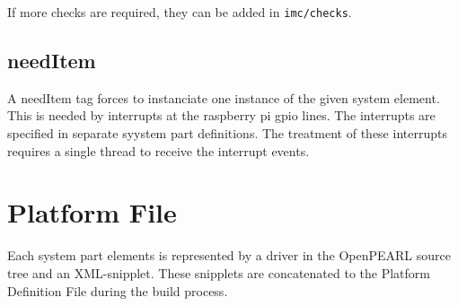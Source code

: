 If more checks are required, they can be added in \texttt{imc/checks}. 

\subsection{needItem}

A needItem tag forces to instanciate one instance of the given system element.
This is needed by interrupts at the raspberry pi gpio lines. The interrupts are
specified in separate syystem part definitions. 
The treatment of these interrupts requires a single thread to receive the 
interrupt events.

 
\section{Platform File}
Each system part elements is represented by a driver in the OpenPEARL 
source tree and an XML-snipplet. These snipplets are
concatenated to the Platform Definition File during the build  process.

